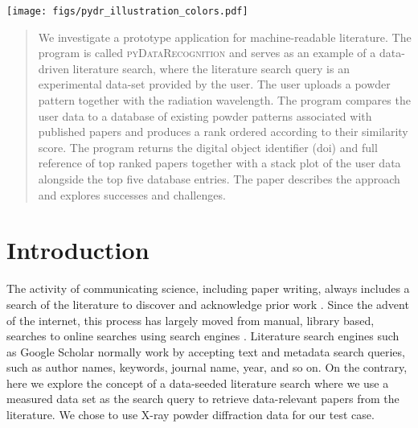 \documentclass[preprint]{iucr}
\newcommand{\pydr}{\textsc{pyDataRecognition}\xspace}
\begin{document}
%
\maketitle
%
\begin{center}
    \texttt{[image: figs/pydr\_illustration\_colors.pdf]}
    \label{fig:pydr_illustration}
\end{center}
%
\newpage
%
\begin{abstract}

We investigate a prototype application for machine-readable literature. The program is called \pydr and serves as an example of a data-driven literature search, where the literature search query is an experimental data-set provided by the user. The user uploads a powder pattern together with the radiation wavelength. The program compares the user data to a database of existing powder patterns associated with published papers and produces a rank ordered according to their similarity score. The program returns the digital object identifier (doi) and full reference of top ranked papers together with a stack plot of the user data alongside the top five database entries. The paper describes the approach and explores successes and challenges.

\end{abstract}
%
\section{Introduction}

The activity of communicating science, including paper writing, always includes a search of the literature to discover and acknowledge prior work \cite{garfieldWhenCite1996}.  Since the advent of the internet, this process has largely moved from manual,  library based, searches to online searches using search engines \cite{butlerSoupedupSearchEngines2000}.
Literature search engines such as Google Scholar \cite{vannoordenGoogleScholarPioneer2014} normally work by accepting text and metadata search queries, such as author names, keywords, journal name, year, and so on.  On the contrary, here we explore the concept of a data-seeded literature search where we use a measured data set as the search query to retrieve data-relevant papers from the literature.  We chose to use  X-ray powder diffraction data for our test case.
\end{document}
